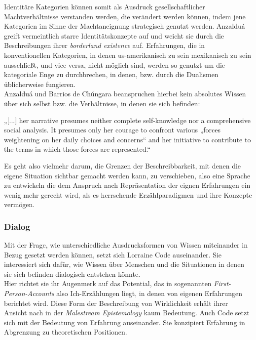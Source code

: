 \noindent Identitäre Kategorien können somit als Ausdruck gesellschaftlicher
Machtverhältnisse verstanden werden, die verändert werden können, indem jene
Kategorien im Sinne der Machtaneignung strategisch genutzt werden. Anzalduá
greift vermeintlich starre Identitätskonzepte auf und weicht sie durch die
Beschreibungen ihrer \textit{borderland existence} auf. Erfahrungen, die in
konventionellen Kategorien, in denen us-amerikanisch zu sein mexikanisch zu
sein ausschließt, und vice versa, nicht möglich sind, werden so genutzt um die
kategoriale Enge zu durchbrechen, in denen, bzw. durch die  Dualismen
üblicherweise fungieren.\footnotemark{}\\
Anzalduá und Barrios de Chúngara beanspruchen hierbei kein absolutes Wissen über sich selbst bzw. die Verhältnisse, in denen sie sich befinden: 
\begin{myenv}
  „[...] her narrative presumes neither complete self-knowledge nor a
  comprehensive social analysis. It presumes only her courage to confront
  various „forces weightening on her daily choices and concerns“ and her
  initiative to contribute to the terms in which those forces are
  represented.“\footnotemark{}
\end{myenv}
Es geht also vielmehr darum, die Grenzen der Beschreibbarkeit, mit denen die
eigene Situation sichtbar gemacht werden kann, zu verschieben, also eine
Sprache zu entwickeln die dem Anspruch nach Repräsentation der eignen
Erfahrungen ein wenig mehr gerecht wird, als es herrschende Erzählparadigmen
und ihre Konzepte vermögen.

\subsubsection{Dialog}

Mit der Frage, wie unterschiedliche Ausdrucksformen von Wissen miteinander
in Bezug gesetzt werden können, setzt sich Lorraine Code auseinander. Sie
interessiert sich dafür,  wie Wissen über Menschen und die  Situationen in
denen sie sich befinden dialogisch entstehen könnte.\\
 Hier richtet sie ihr
Augenmerk auf das Potential, das in sogenannten \textit{First-Person-Accounts} also
Ich-Erzählungen liegt, in denen von eigenen Erfahrungen berichtet wird. Diese
Form der Beschreibung von Wirklichkeit erhält ihrer Ansicht nach in der
\textit{Malestream Epistemology} kaum Bedeutung.\footnotemark {} Auch Code setzt sich mit der Bedeutung von Erfahrung auseinander. Sie konzipiert Erfahrung in Abgrenzung zu theoretischen Positionen. \\

